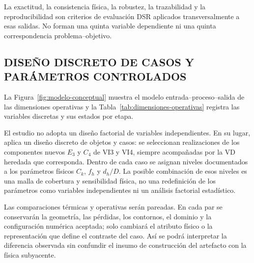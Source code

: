 La exactitud, la consistencia física, la robustez, la trazabilidad y la reproducibilidad son criterios de evaluación DSR aplicados transversalmente a esas salidas. No forman una quinta variable dependiente ni una quinta correspondencia problema--objetivo.

\subsection{DISEÑO DISCRETO DE CASOS Y PARÁMETROS CONTROLADOS}

La Figura~\ref{fig:modelo-conceptual} muestra el modelo entrada--proceso--salida de las dimensiones operativas y la Tabla~\ref{tab:dimensiones-operativas} registra las variables discretas y sus estados por etapa.

El estudio no adopta un diseño factorial de variables independientes. En su lugar, aplica un diseño discreto de objetos y casos: se seleccionan realizaciones de los componentes nuevos $E_3$ y $C_4$ de VI3 y VI4, siempre acompañadas por la VD heredada que corresponda. Dentro de cada caso se asignan niveles documentados a los parámetros físicos $C_k$, $f_h$ y $d_h/D$. La posible combinación de esos niveles es una malla de cobertura y sensibilidad física, no una redefinición de los parámetros como variables independientes ni un análisis factorial estadístico.

Las comparaciones térmicas y operativas serán pareadas. En cada par se conservarán la geometría, las pérdidas, los contornos, el dominio y la configuración numérica aceptada; solo cambiará el atributo físico o la representación que define el contraste del caso. Así se podrá interpretar la diferencia observada sin confundir el insumo de construcción del artefacto con la física subyacente.

